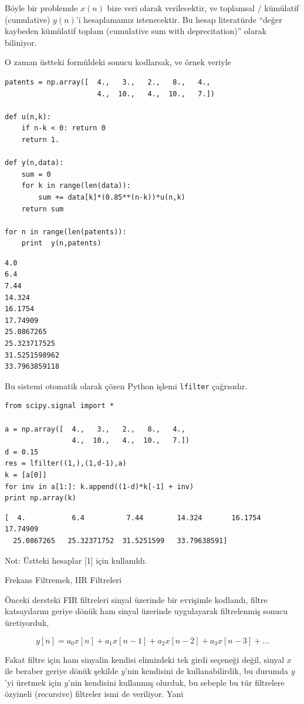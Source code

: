 \documentclass[12pt,fleqn]{article}\usepackage{../../common}
\begin{document}
Böyle bir problemde $x(n)$ bize veri olarak verilecektir, ve toplamsal /
kümülatif (cumulative) $y(n)$'i hesaplamamız istenecektir. Bu hesap
literatürde ``değer kaybeden kümülatif toplam (cumulative sum with
deprecitation)'' olarak biliniyor.

O zaman üstteki formüldeki sonucu kodlarsak, ve örnek veriyle

\begin{verbatim}
patents = np.array([  4.,   3.,   2.,   8.,   4.,  
                      4.,  10.,   4.,  10.,   7.])

def u(n,k):
    if n-k < 0: return 0
    return 1.

def y(n,data):
    sum = 0
    for k in range(len(data)):
        sum += data[k]*(0.85**(n-k))*u(n,k)
    return sum

for n in range(len(patents)):    
    print  y(n,patents)
\end{verbatim}

\begin{verbatim}
4.0
6.4
7.44
14.324
16.1754
17.74909
25.0867265
25.323717525
31.5251598962
33.7963859118
\end{verbatim}

Bu sistemi otomatik olarak çözen Python işlemi \verb!lfilter!
çağrısıdır.

\begin{verbatim}
from scipy.signal import *

a = np.array([  4.,   3.,   2.,   8.,   4.,  
                4.,  10.,   4.,  10.,   7.])
d = 0.15 
res = lfilter((1,),(1,d-1),a) 
k = [a[0]] 
for inv in a[1:]: k.append((1-d)*k[-1] + inv) 
print np.array(k) 
\end{verbatim}

\begin{verbatim}
[  4.           6.4          7.44        14.324       16.1754      17.74909
  25.0867265   25.32371752  31.5251599   33.79638591]
\end{verbatim}

Not: Üstteki hesaplar [1] için kullanıldı.

Frekans Filtremek, IIR Filtreleri

Önceki dersteki FIR filtreleri sinyal üzerinde bir evrişimle kodlandı,
filtre katsayılarını geriye dönük ham sinyal üzerinde uygulayarak
filtrelenmiş sonucu üretiyorduk,

$$ y[n] = a_0 x[n] + a_1 x[n-1] + a_2 x[n-2] +  a_3 x[n-3] + ... $$

Fakat filtre için ham sinyalin kendisi elimizdeki tek girdi seçeneği değil,
sinyal $x$ ile beraber geriye dönük şekilde $y$'nin kendisini de
kullanabilirdik, bu durumda $y$'yi üretmek için $y$'nin kendisini kullanmış
olurduk, bu sebeple bu tür filtrelere özyineli (recursive) filtreler ismi
de veriliyor. Yani
\end{document}
